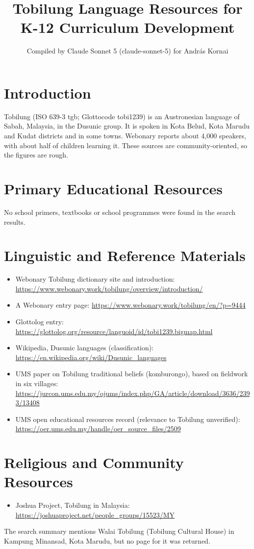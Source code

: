 \documentclass[12pt]{article}
\title{Tobilung Language Resources for K-12 Curriculum Development}
\author{Compiled by Claude Sonnet 5 (claude-sonnet-5) for Andr\'as Kornai}
\date{}
\begin{document}
\maketitle

\section{Introduction}
Tobilung (ISO 639-3 tgb; Glottocode tobi1239) is an Austronesian language of Sabah, Malaysia, in the Dusunic group. It is spoken in Kota Belud, Kota Marudu and Kudat districts and in some towns. Webonary reports about 4,000 speakers, with about half of children learning it. These sources are community-oriented, so the figures are rough.

\section{Primary Educational Resources}
No school primers, textbooks or school programmes were found in the search results.

\section{Linguistic and Reference Materials}
\begin{itemize}
\item Webonary Tobilung dictionary site and introduction: \url{https://www.webonary.work/tobilung/overview/introduction/}
\item A Webonary entry page: \url{https://www.webonary.work/tobilung/en/?p=9444}
\item Glottolog entry: \url{https://glottolog.org/resource/languoid/id/tobi1239.bigmap.html}
\item Wikipedia, Dusunic languages (classification): \url{https://en.wikipedia.org/wiki/Dusunic_languages}
\item UMS paper on Tobilung traditional beliefs (komburongo), based on fieldwork in six villages: \url{https://jurcon.ums.edu.my/ojums/index.php/GA/article/download/3636/2393/13408}
\item UMS open educational resources record (relevance to Tobilung unverified): \url{https://oer.ums.edu.my/handle/oer_source_files/2509}
\end{itemize}

\section{Religious and Community Resources}
\begin{itemize}
\item Joshua Project, Tobilung in Malaysia: \url{https://joshuaproject.net/people_groups/15523/MY}
\end{itemize}
The search summary mentions Walai Tobilung (Tobilung Cultural House) in Kampung Minansad, Kota Marudu, but no page for it was returned.
\end{document}
